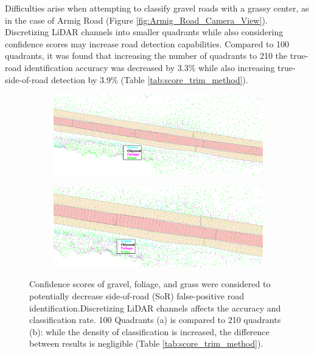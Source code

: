 \documentclass[journal,onecolumn]{IEEEtran}
\begin{document}
	{Difficulties arise when attempting to classify gravel roads with a grassy center, as in the case of Armig Road (Figure \ref{fig:Armig_Road_Camera_View}). Discretizing LiDAR channels into smaller quadrants while also considering confidence scores may increase road detection capabilities. Compared to 100 quadrants, it was found that increasing the number of quadrants to 210 the true-road identification accuracy was decreased by 3.3\% while also increasing true-side-of-road detection by 3.9\% (Table \ref{tab:score_trim_method}).}
	
	\begin{figure}[H]
		\centering
		\begin{subfigure}{0.45\textwidth}
			\centering
			\includegraphics[width=0.95\linewidth]{figures/100_quad_score_test}
			\caption[]{}
			\label{fig:100_quad_size_score_trim}
		\end{subfigure}
		\begin{subfigure}{0.45\textwidth}
			\centering
			\includegraphics[width=0.95\linewidth]{figures/210_quad_score_test}
			\caption[]{}
			\label{fig:210_quad_size_score_trim}
		\end{subfigure}
		\caption[Comparing Quadrant Size and Score-based Re-classification]{Confidence scores of gravel, foliage, and grass were considered to potentially decrease side-of-road (SoR) false-positive road identification.Discretizing LiDAR channels affects the accuracy and classification rate. 100 Quadrants (a) is compared to 210 quadrants (b): while the density of classification is increased, the difference between results is negligible (Table \ref{tab:score_trim_method}).}
		\label{fig:score_trim_method}
	\end{figure}
\end{document}

